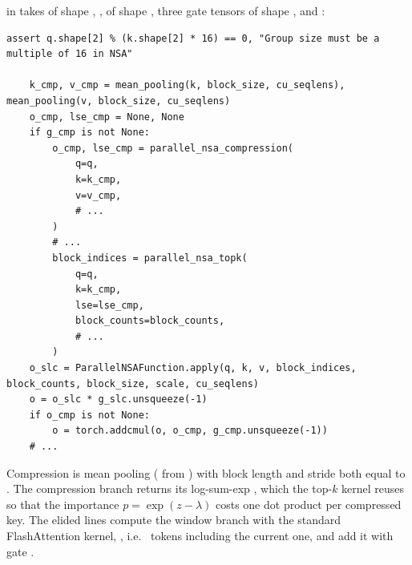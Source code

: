 \begin{implnote}[title={In the code: \texttt{parallel\_nsa}, the three branches}]
 in
 takes
 of shape \code{[B, T, HQ, K]}, ,  of shape \code{[B, T, H, K]}, three gate
tensors of shape \code{[B, T, HQ]},  and :
\begin{lstlisting}[caption={Excerpt from \texttt{repos/\allowbreak{}fla-org\_\_native-sparse-attention/\allowbreak{}native\_sparse\_attention/\allowbreak{}ops/\allowbreak{}parallel.py}},label={lst:c04-nsa-parallel}]
    assert q.shape[2] % (k.shape[2] * 16) == 0, "Group size must be a multiple of 16 in NSA"

    k_cmp, v_cmp = mean_pooling(k, block_size, cu_seqlens), mean_pooling(v, block_size, cu_seqlens)
    o_cmp, lse_cmp = None, None
    if g_cmp is not None:
        o_cmp, lse_cmp = parallel_nsa_compression(
            q=q,
            k=k_cmp,
            v=v_cmp,
            # ...
        )
        # ...
        block_indices = parallel_nsa_topk(
            q=q,
            k=k_cmp,
            lse=lse_cmp,
            block_counts=block_counts,
            # ...
        )
    o_slc = ParallelNSAFunction.apply(q, k, v, block_indices, block_counts, block_size, scale, cu_seqlens)
    o = o_slc * g_slc.unsqueeze(-1)
    if o_cmp is not None:
        o = torch.addcmul(o, o_cmp, g_cmp.unsqueeze(-1))
    # ...
\end{lstlisting}
Compression is mean pooling ( from \fla) with block length and stride both
equal to . The compression branch returns its log-sum-exp , which
the top-$k$ kernel reuses so that the importance $p=\exp(z-\lambda)$ costs one dot product per
compressed key. The elided lines compute the window branch with the standard FlashAttention
kernel, , i.e.\
 tokens including the current one, and add it with gate .
\end{implnote}

